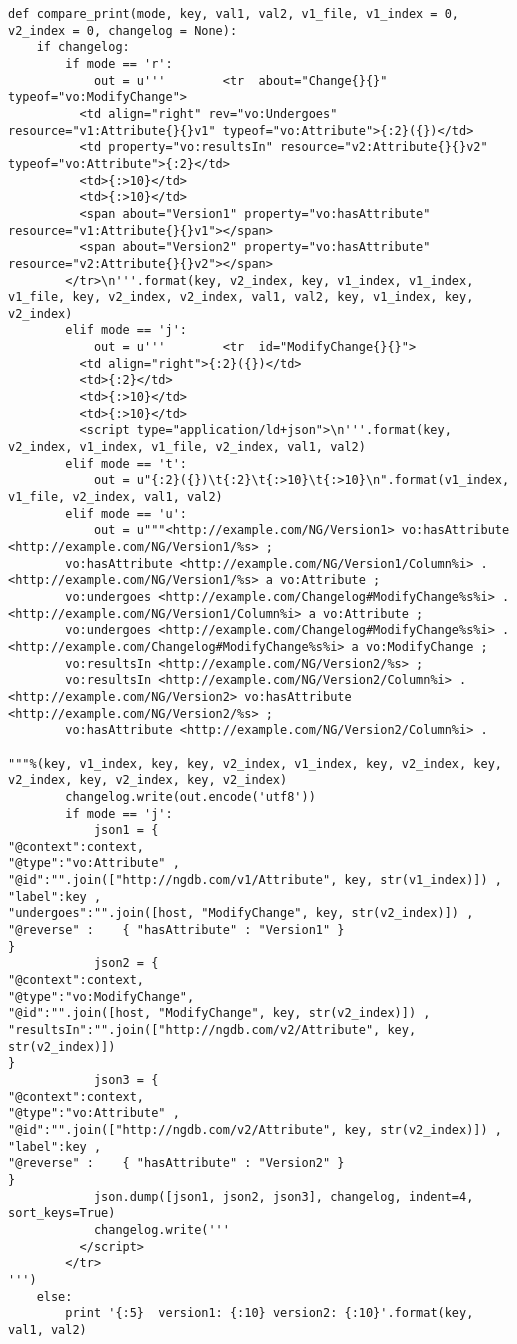 \begin{verbatim}
def compare_print(mode, key, val1, val2, v1_file, v1_index = 0, v2_index = 0, changelog = None):
	if changelog:
		if mode == 'r':
			out = u'''        <tr  about="Change{}{}" typeof="vo:ModifyChange">
          <td align="right" rev="vo:Undergoes" resource="v1:Attribute{}{}v1" typeof="vo:Attribute">{:2}({})</td>
          <td property="vo:resultsIn" resource="v2:Attribute{}{}v2" typeof="vo:Attribute">{:2}</td>
          <td>{:>10}</td>
          <td>{:>10}</td>
          <span about="Version1" property="vo:hasAttribute" resource="v1:Attribute{}{}v1"></span>
          <span about="Version2" property="vo:hasAttribute" resource="v2:Attribute{}{}v2"></span>
        </tr>\n'''.format(key, v2_index, key, v1_index, v1_index, v1_file, key, v2_index, v2_index, val1, val2, key, v1_index, key, v2_index)
		elif mode == 'j':
			out = u'''        <tr  id="ModifyChange{}{}">
          <td align="right">{:2}({})</td>
          <td>{:2}</td>
          <td>{:>10}</td>
          <td>{:>10}</td>
          <script type="application/ld+json">\n'''.format(key, v2_index, v1_index, v1_file, v2_index, val1, val2)
		elif mode == 't':
			out = u"{:2}({})\t{:2}\t{:>10}\t{:>10}\n".format(v1_index, v1_file, v2_index, val1, val2)
		elif mode == 'u':
			out = u"""<http://example.com/NG/Version1> vo:hasAttribute <http://example.com/NG/Version1/%s> ;
        vo:hasAttribute <http://example.com/NG/Version1/Column%i> .
<http://example.com/NG/Version1/%s> a vo:Attribute ;
        vo:undergoes <http://example.com/Changelog#ModifyChange%s%i> .
<http://example.com/NG/Version1/Column%i> a vo:Attribute ;
        vo:undergoes <http://example.com/Changelog#ModifyChange%s%i> .
<http://example.com/Changelog#ModifyChange%s%i> a vo:ModifyChange ;
        vo:resultsIn <http://example.com/NG/Version2/%s> ;
        vo:resultsIn <http://example.com/NG/Version2/Column%i> .
<http://example.com/NG/Version2> vo:hasAttribute <http://example.com/NG/Version2/%s> ;
        vo:hasAttribute <http://example.com/NG/Version2/Column%i> .

"""%(key, v1_index, key, key, v2_index, v1_index, key, v2_index, key, v2_index, key, v2_index, key, v2_index)
		changelog.write(out.encode('utf8'))
		if mode == 'j':
			json1 = {
"@context":context,
"@type":"vo:Attribute" ,
"@id":"".join(["http://ngdb.com/v1/Attribute", key, str(v1_index)]) ,
"label":key ,
"undergoes":"".join([host, "ModifyChange", key, str(v2_index)]) ,
"@reverse" :    { "hasAttribute" : "Version1" }
}
			json2 = {
"@context":context,
"@type":"vo:ModifyChange",
"@id":"".join([host, "ModifyChange", key, str(v2_index)]) ,
"resultsIn":"".join(["http://ngdb.com/v2/Attribute", key, str(v2_index)])
}
			json3 = {
"@context":context,
"@type":"vo:Attribute" ,
"@id":"".join(["http://ngdb.com/v2/Attribute", key, str(v2_index)]) ,
"label":key ,
"@reverse" :    { "hasAttribute" : "Version2" }
}
			json.dump([json1, json2, json3], changelog, indent=4, sort_keys=True)
			changelog.write('''
          </script>
        </tr>
''')
	else:
		print '{:5}  version1: {:10} version2: {:10}'.format(key, val1, val2)


\end{verbatim}
